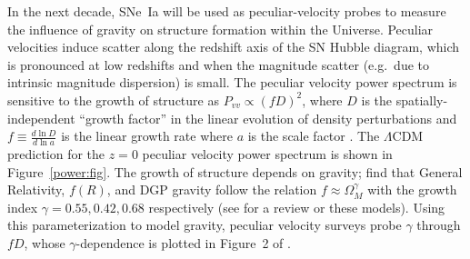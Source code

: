 \documentclass[11pt, oneside]{article}   	%
\begin{document}
In the next decade, SNe~Ia will be used as peculiar-velocity probes to measure  the influence of gravity on structure formation within the Universe.
Peculiar velocities induce scatter along the redshift axis of the SN Hubble diagram, which is
pronounced at low redshifts and when the magnitude scatter (e.g.\ due to intrinsic magnitude dispersion) is small.
The peculiar velocity power spectrum is sensitive to the growth of structure as $P_{vv}\propto (fD)^2$, where $D$ is  the spatially-independent
``growth factor'' in the linear evolution of density perturbations and
$f \equiv \frac{d\ln{D}}{d\ln{a}}$ is the linear growth rate where $a$ is the scale factor  \cite{2006PhRvD..73l3526H,2011ApJ...741...67D}.
The $\Lambda$CDM prediction for the $z=0$ peculiar velocity power spectrum is shown in Figure~\ref{power:fig}. The growth of structure depends on gravity;
\cite{2007APh....28..481L} find that General Relativity, $f(R)$,  and DGP gravity follow the relation
$f \approx \Omega_M^\gamma$ with the growth index $\gamma=0.55, 0.42, 0.68$ respectively (see \cite{HUTERER201523} for a review
or these  models).  Using this parameterization to model gravity, peculiar velocity
surveys probe $\gamma$ through $fD$, whose $\gamma$-dependence is plotted 
in Figure~2 of  \cite{1475-7516-2013-04-031}.
%
\end{document}
